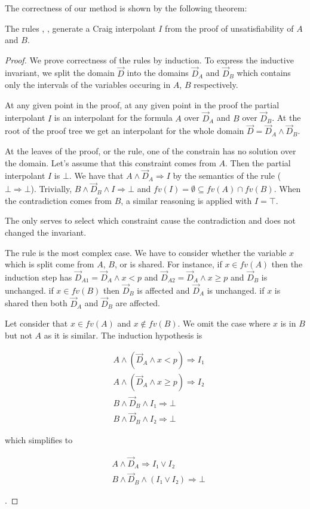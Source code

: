 The correctness of our method is shown by the following theorem:
\begin{theorem}
The rules \spltI, \thLemI, \weakenI generate a Craig interpolant $I$ from the proof of unsatisfiability of $A$ and $B$.
\label{thm:sound}
\end{theorem}
\begin{proof}
We prove correctness of the rules by induction.
To express the inductive invariant, we split the domain $\vec D$ into the domains $\vec D_A$ and $\vec D_B$ which contains only the intervals of the variables occuring in $A$, $B$ respectively.

At any given point in the proof, at any given point in the proof the partial interpolant $I$ is an interpolant for the formula $A$ over $\vec D_A$ and $B$ over $\vec D_B$.
At the root of the proof tree we get an interpolant for the whole domain $\vec D = \vec D_A ∧ \vec D_B$.

At the leaves of the proof, or the \thLemI rule, one of the constrain has no solution over the domain.
Let's assume that this constraint comes from $A$.
Then the partial interpolant $I$ is $⊥$.
We have that $A ∧ \vec D_A ⇒ I$ by the semantics of the \thLem rule ($⊥⇒⊥$).
Trivially, $B ∧ \vec D_B ∧ I ⇒ ⊥$ and $fv(I) = ∅ ⊆ fv(A) ∩ fv(B)$.
When the contradiction comes from $B$, a similar reasoning is applied with $I=⊤$.

The \weakenI only serves to select which constraint cause the contradiction and does not changed the invariant.

The \spltI rule is the most complex case.
We have to consider whether the variable $x$ which is split come from $A$, $B$, or is shared.
For instance, if $x∈ fv(A)$ then the induction step has $\vec D_{A1} = \vec D_A ∧ x < p$ and $\vec D_{A2} = \vec D_A ∧ x ≥ p$ and $\vec D_B$ is unchanged.
if $x ∈ fv(B)$ then $\vec D_B$ is affected and $\vec D_A$ is unchanged.
if $x$ is shared then both $\vec D_A$ and $\vec D_B$ are affected.

Let consider that $x ∈ fv(A)$ and $x ∉ fv(B)$.
We omit the case where $x$ is in $B$ but not $A$ as it is similar.
The induction hypothesis is\\
\parbox{0.35\linewidth}{
\begin{eqnarray*}
& A ∧ (\vec D_A ∧ x < p) ⇒ I₁ \\
& A ∧ (\vec D_A ∧ x ≥ p) ⇒ I₂ \\
& B ∧ \vec D_B ∧ I₁ ⇒ ⊥ \\
& B ∧ \vec D_B ∧ I₂ ⇒ ⊥
\end{eqnarray*}
}
which simplifies to
\parbox{0.35\linewidth}{
\begin{eqnarray*}
& A ∧ \vec D_A ⇒ I₁ ∨ I₂ \\
& B ∧ \vec D_B ∧ (I₁ ∨ I₂) ⇒ ⊥
\end{eqnarray*}
}.


\end{proof}
